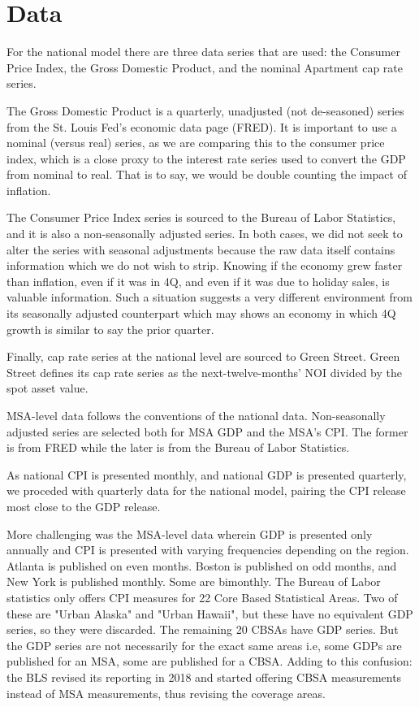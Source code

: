 \section{Data}
For the national model there are three data series that are used: the Consumer Price Index, the Gross Domestic Product, and the nominal Apartment cap rate series. 

The Gross Domestic Product is a quarterly, unadjusted (not de-seasoned) series from the St. Louis Fed's economic data page (FRED). It is important to use a nominal (versus real) series, as we are comparing this to the consumer price index, which is a close proxy to the interest rate series used to convert the GDP from nominal to real. That is to say, we would be double counting the impact of inflation.

The Consumer Price Index series is sourced to the Bureau of Labor Statistics, and it is also a non-seasonally adjusted series. In both cases, we did not seek to alter the series with seasonal adjustments because the raw data itself contains information which we do not wish to strip. Knowing if the economy grew faster than inflation, even if it was in 4Q, and even if it was due to holiday sales, is valuable information. Such a situation suggests a very different environment from its seasonally adjusted counterpart which may shows an economy in which 4Q growth is similar to say the prior quarter.

Finally, cap rate series at the national level are sourced to Green Street. Green Street defines its cap rate series as the next-twelve-months' NOI divided by the spot asset value. 

MSA-level data follows the conventions of the national data. Non-seasonally adjusted series are selected both for MSA GDP and the MSA's CPI. The former is from FRED while the later is from the Bureau of Labor Statistics.

As national CPI is presented monthly, and national GDP is presented quarterly, we proceded with quarterly data for the national model, pairing the CPI release most close to the GDP release. 

More challenging was the MSA-level data wherein GDP is presented only annually and CPI is presented with varying frequencies depending on the region. Atlanta is published on even months. Boston is published on odd months, and New York is published monthly. Some are bimonthly. The Bureau of Labor statistics only offers CPI measures for 22 Core Based Statistical Areas. Two of these are "Urban Alaska" and "Urban Hawaii", but these have no equivalent GDP series, so they were discarded. The remaining 20 CBSAs have GDP series. But the GDP series are not necessarily for the exact same areas i.e, some GDPs are published for an MSA, some are published for a CBSA. Adding to this confusion: the BLS revised its reporting in 2018 and started offering CBSA measurements instead of MSA measurements, thus revising the coverage areas.

